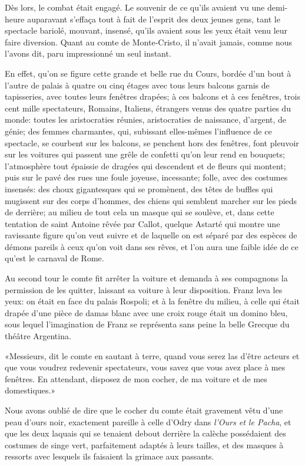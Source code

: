 Dès lors, le combat était engagé. Le souvenir de ce qu'ils avaient vu une demi-heure auparavant s'effaça tout à fait de l'esprit des deux jeunes gens, tant le spectacle bariolé, mouvant, insensé, qu'ils avaient sous les yeux était venu leur faire diversion. Quant au comte de Monte-Cristo, il n'avait jamais, comme nous l'avons dit, paru impressionné un seul instant. 

En effet, qu'on se figure cette grande et belle rue du Cours, bordée d'un bout à l'autre de palais à quatre ou cinq étages avec tous leurs balcons garnis de tapisseries, avec toutes leurs fenêtres drapées; à ces balcons et à ces fenêtres, trois cent mille spectateurs, Romains, Italiens, étrangers venus des quatre parties du monde: toutes les aristocraties réunies, aristocraties de naissance, d'argent, de génie; des femmes charmantes, qui, subissant elles-mêmes l'influence de ce spectacle, se courbent sur les balcons, se penchent hors des fenêtres, font pleuvoir sur les voitures qui passent une grêle de confetti qu'on leur rend en bouquets; l'atmosphère tout épaissie de dragées qui descendent et de fleurs qui montent; puis sur le pavé des rues une foule joyeuse, incessante; folle, avec des costumes insensés: des choux gigantesques qui se promènent, des têtes de buffles qui mugissent sur des corps d'hommes, des chiens qui semblent marcher sur les pieds de derrière; au milieu de tout cela un masque qui se soulève, et, dans cette tentation de saint Antoine rêvée par Callot, quelque Astarté qui montre une ravissante figure qu'on veut suivre et de laquelle on est séparé par des espèces de démons pareils à ceux qu'on voit dans ses rêves, et l'on aura une faible idée de ce qu'est le carnaval de Rome. 

Au second tour le comte fit arrêter la voiture et demanda à ses compagnons la permission de les quitter, laissant sa voiture à leur disposition. Franz leva les yeux: on était en face du palais Rospoli; et à la fenêtre du milieu, à celle qui était drapée d'une pièce de damas blanc avec une croix rouge était un domino bleu, sous lequel l'imagination de Franz se représenta sans peine la belle Grecque du théâtre Argentina. 

«Messieurs, dit le comte en sautant à terre, quand vous serez las d'être acteurs et que vous voudrez redevenir spectateurs, vous savez que vous avez place à mes fenêtres. En attendant, disposez de mon cocher, de ma voiture et de mes domestiques.» 

Nous avons oublié de dire que le cocher du comte était gravement vêtu d'une peau d'ours noir, exactement pareille à celle d'Odry dans \textit{l'Ours et le Pacha}, et que les deux laquais qui se tenaient debout derrière la calèche possédaient des costumes de singe vert, parfaitement adaptés à leurs tailles, et des masques à ressorts avec lesquels ils faisaient la grimace aux passants. 

